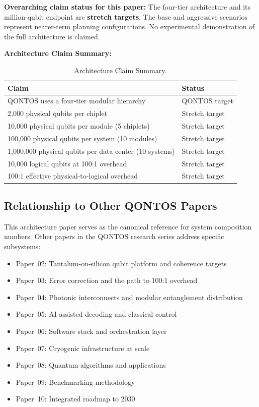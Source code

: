 \documentclass[conference]{IEEEtran}
\begin{document}
\textbf{Overarching claim status for this paper:} The four-tier architecture and its million-qubit endpoint are \textbf{stretch targets}. The base and aggressive scenarios represent nearer-term planning configurations. No experimental demonstration of the full architecture is claimed.

\textbf{Architecture Claim Summary:}

\begin{table}[htbp]
\centering
\caption{Architecture Claim Summary.}
\label{tab:arch_claims}
\begin{tabular}{lp{3cm}}
\toprule
\textbf{Claim} & \textbf{Status} \\
\midrule
QONTOS uses a four-tier modular hierarchy & QONTOS target \\
2,000 physical qubits per chiplet & Stretch target \\
10,000 physical qubits per module (5 chiplets) & Stretch target \\
100,000 physical qubits per system (10 modules) & Stretch target \\
1,000,000 physical qubits per data center (10 systems) & Stretch target \\
10,000 logical qubits at 100:1 overhead & Stretch target \\
100:1 effective physical-to-logical overhead & Stretch target \\
\bottomrule
\end{tabular}
\end{table}

\subsection{Relationship to Other QONTOS Papers}

This architecture paper serves as the canonical reference for system composition numbers. Other papers in the QONTOS research series address specific subsystems:

\begin{itemize}
\item Paper~02: Tantalum-on-silicon qubit platform and coherence targets
\item Paper~03: Error correction and the path to 100:1 overhead
\item Paper~04: Photonic interconnects and modular entanglement distribution
\item Paper~05: AI-assisted decoding and classical control
\item Paper~06: Software stack and orchestration layer
\item Paper~07: Cryogenic infrastructure at scale
\item Paper~08: Quantum algorithms and applications
\item Paper~09: Benchmarking methodology
\item Paper~10: Integrated roadmap to 2030
\end{itemize}
\end{document}
